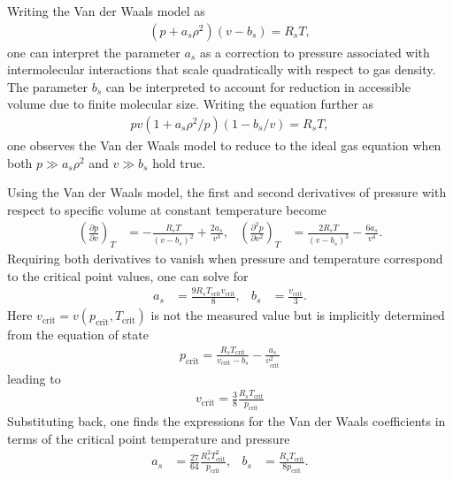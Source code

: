 \begin{example}
    Writing the Van der Waals model as
    \begin{align*}
        (p+a_s\rho^2)(v-b_s)=R_sT,
    \end{align*}
    one can interpret the parameter $a_s$ as a correction to pressure associated with intermolecular interactions that scale quadratically with respect to gas density. The parameter $b_s$ can be interpreted to account for reduction in accessible volume due to finite molecular size. Writing the equation further as
    \begin{align*}
        pv(1+a_s\rho^2/p)(1-b_s/v)=R_sT,
    \end{align*}
    one observes the Van der Waals model to reduce to the ideal gas equation when both $p\gg a_s\rho^2$ and $v\gg b_s$ hold true.
\end{example}
\begin{example}
    Using the Van der Waals model, the first and second derivatives of pressure with respect to specific volume at constant temperature become
    \begin{align*}
        \left(\frac{\partial p}{\partial v}\right)_T&=-\frac{R_sT}{(v-b_s)^2}+\frac{2a_s}{v^3}, &
        \left(\frac{\partial^2 p}{\partial v^2}\right)_T&=\frac{2R_sT}{(v-b_s)^3}-\frac{6a_s}{v^4}.
    \end{align*}
    Requiring both derivatives to vanish when pressure and temperature correspond to the critical point values, one can solve for
    \begin{align*}
        a_s&=\frac{9R_sT_\text{crit}v_\text{crit}}{8}, & b_s&=\frac{v_\text{crit}}{3}.
    \end{align*}
    Here $v_\text{crit}=v(p_\text{crit},T_\text{crit})$ is not the measured value but is implicitly determined from the equation of state
    \begin{align*}
        p_\text{crit}=\frac{R_sT_\text{crit}}{v_\text{crit}-b_s}-\frac{a_s}{v_\text{crit}^2}
    \end{align*}
    leading to 
    \begin{align*}
        v_\text{crit}=\frac{3}{8}\frac{R_sT_\text{crit}}{p_\text{crit}}
    \end{align*}
    Substituting back, one finds the expressions for the Van der Waals coefficients in terms of the critical point temperature and pressure
    \begin{align*}
        a_s&=\frac{27}{64}\frac{R_s^2T_\text{crit}^2}{p_\text{crit}}, &
        b_s&=\frac{R_sT_\text{crit}}{8p_\text{crit}}.
    \end{align*}
\end{example}

